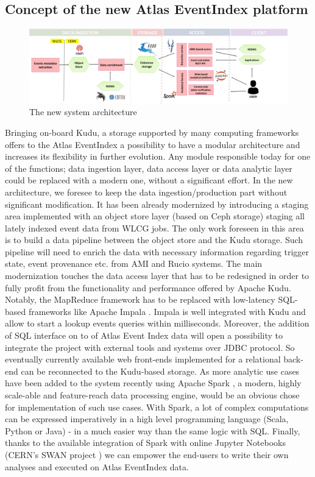 \documentclass{webofc}
\begin{document}
\begin{linenumbers}
\section{Concept of the new Atlas EventIndex platform}
\label{sec-4}
\begin{figure}[h]
\centering
\includegraphics[width=\linewidth,clip]{architecture.jpg}
\caption{The new system architecture}
\label{fig:arch}
\end{figure}
\noindent
Bringing on-board Kudu, a storage supported by many computing frameworks offers to the Atlas EventIndex a possibility to have a modular architecture and increases its flexibility in further evolution. Any module responsible today for one of the functions; data ingestion layer, data access layer or data analytic layer could be replaced with a modern one, without a significant effort. \newline
In the new architecture, we foresee to keep the data ingestion/production part without significant modification. It has been already modernized by introducing a staging area implemented with an object store layer \cite{CEPH} (based on Ceph storage) staging all lately indexed event data from WLCG \cite{WLCG} jobs. The only work foreseen in this area is to build a data pipeline between the object store and the Kudu storage. Such pipeline will need to enrich the data with necessary information regarding trigger state, event provenance etc. from AMI \cite{AMI} and Rucio \cite{Rucio} systems. \newline
\indent
The main modernization touches the data access layer that has to be redesigned in order to fully profit from the functionality and performance offered by Apache Kudu. Notably, the MapReduce framework has to be replaced with low-latency SQL-based frameworks like Apache Impala \cite{Impala}. Impala is well integrated with Kudu and allow to start a lookup events queries within milliseconds. Moreover, the addition of SQL interface on to of Atlas Event Index data will open a possibility to integrate the project with external tools and systems over JDBC protocol. So eventually currently available web front-ends implemented for a relational back-end can be reconnected to the Kudu-based storage. \newline 
As more analytic use cases have been added to the system recently using Apache Spark \cite{Spark}, a modern, highly scale-able and feature-reach data processing engine, would be an obvious chose for implementation of such use cases. With Spark, a lot of complex computations can be expressed imperatively in a high level programming language (Scala, Python or Java) - in a much easier way than the same logic with SQL. Finally, thanks to the available integration of Spark with online Jupyter Notebooks (CERN's SWAN project \cite{SWAN}) we can empower the end-users to write their own analyses and executed on Atlas EventIndex data.

\end{linenumbers}
\end{document}
